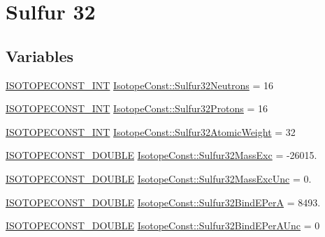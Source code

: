 \hypertarget{group___isotope_const-_sulfur-_s32}{}\section{Sulfur 32}
\label{group___isotope_const-_sulfur-_s32}
\subsection*{Variables}
\begin{DoxyCompactItemize}
\item 
\mbox{\hyperlink{group___isotope_const-_macros_ga5f18360b3e99483a35c32d789e62621c}{I\+S\+O\+T\+O\+P\+E\+C\+O\+N\+S\+T\+\_\+\+I\+NT}} \mbox{\hyperlink{group___isotope_const-_sulfur-_s32_ga82a374c1a9e206841240c9f3fa28257e}{Isotope\+Const\+::\+Sulfur32\+Neutrons}} = 16
\item 
\mbox{\hyperlink{group___isotope_const-_macros_ga5f18360b3e99483a35c32d789e62621c}{I\+S\+O\+T\+O\+P\+E\+C\+O\+N\+S\+T\+\_\+\+I\+NT}} \mbox{\hyperlink{group___isotope_const-_sulfur-_s32_ga8c8574f45606428613423e3701081007}{Isotope\+Const\+::\+Sulfur32\+Protons}} = 16
\item 
\mbox{\hyperlink{group___isotope_const-_macros_ga5f18360b3e99483a35c32d789e62621c}{I\+S\+O\+T\+O\+P\+E\+C\+O\+N\+S\+T\+\_\+\+I\+NT}} \mbox{\hyperlink{group___isotope_const-_sulfur-_s32_ga73c2c490cbee5b7a3d72b27bad91fb6f}{Isotope\+Const\+::\+Sulfur32\+Atomic\+Weight}} = 32
\item 
\mbox{\hyperlink{group___isotope_const-_macros_ga8f45a7272ce02c0b4c65c44636ed719a}{I\+S\+O\+T\+O\+P\+E\+C\+O\+N\+S\+T\+\_\+\+D\+O\+U\+B\+LE}} \mbox{\hyperlink{group___isotope_const-_sulfur-_s32_ga2ccee2aeb37d25cea41a57b6aa2e779b}{Isotope\+Const\+::\+Sulfur32\+Mass\+Exc}} = -\/26015.
\item 
\mbox{\hyperlink{group___isotope_const-_macros_ga8f45a7272ce02c0b4c65c44636ed719a}{I\+S\+O\+T\+O\+P\+E\+C\+O\+N\+S\+T\+\_\+\+D\+O\+U\+B\+LE}} \mbox{\hyperlink{group___isotope_const-_sulfur-_s32_ga8f64fd2ccbcc64acdda5f3999206ef31}{Isotope\+Const\+::\+Sulfur32\+Mass\+Exc\+Unc}} = 0.
\item 
\mbox{\hyperlink{group___isotope_const-_macros_ga8f45a7272ce02c0b4c65c44636ed719a}{I\+S\+O\+T\+O\+P\+E\+C\+O\+N\+S\+T\+\_\+\+D\+O\+U\+B\+LE}} \mbox{\hyperlink{group___isotope_const-_sulfur-_s32_gaebb2c2c2d1c0cfa84956fb0bb419c3ac}{Isotope\+Const\+::\+Sulfur32\+Bind\+E\+PerA}} = 8493.
\item 
\mbox{\hyperlink{group___isotope_const-_macros_ga8f45a7272ce02c0b4c65c44636ed719a}{I\+S\+O\+T\+O\+P\+E\+C\+O\+N\+S\+T\+\_\+\+D\+O\+U\+B\+LE}} \mbox{\hyperlink{group___isotope_const-_sulfur-_s32_gaf7e15143affa292b2a3899755e04680d}{Isotope\+Const\+::\+Sulfur32\+Bind\+E\+Per\+A\+Unc}} = 0

\end{DoxyCompactItemize}
